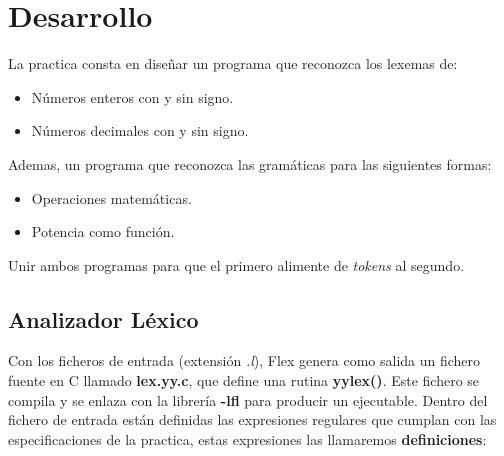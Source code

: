\section{Desarrollo}

La practica consta en diseñar un programa que reconozca los lexemas de:

\begin{itemize}
\item Números enteros con y sin signo.
\item Números decimales con y sin signo.
\end{itemize}

Ademas, un programa que reconozca las gramáticas para las siguientes formas:

\begin{itemize}
\item Operaciones matemáticas.
\item Potencia como función.
\end{itemize}

Unir ambos programas para que el primero alimente de \textit{tokens} al segundo.

\subsection{Analizador Léxico}

Con los ficheros de entrada (extensión \textit{.l}), Flex genera como salida un fichero fuente en C llamado \textbf{lex.yy.c}, que define una rutina \textbf{yylex()}. Este fichero se compila y se enlaza con la librería \textbf{-lfl} para producir un ejecutable. Dentro del fichero de entrada están definidas las expresiones regulares que cumplan con las especificaciones de la practica, estas expresiones las llamaremos \textbf{definiciones}:

